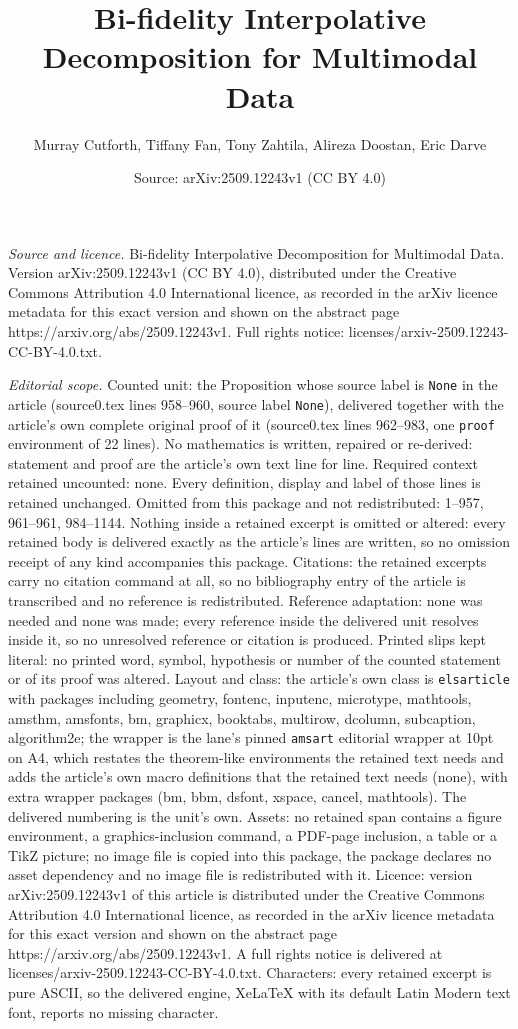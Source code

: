 \documentclass[10pt,a4paper]{amsart}
\title[Bi-fidelity Interpolative Decomposition for Multimodal Data]{Bi-fidelity Interpolative Decomposition for Multimodal Data}
\author{Murray Cutforth, Tiffany Fan, Tony Zahtila, Alireza Doostan, Eric Darve}
\date{Source: arXiv:2509.12243v1 (CC BY 4.0)}
\begin{document}
\maketitle

\noindent\emph{Source and licence.} Bi-fidelity Interpolative Decomposition for Multimodal Data. Version arXiv:2509.12243v1 (CC BY 4.0), distributed under the Creative Commons Attribution 4.0 International licence, as recorded in the arXiv licence metadata for this exact version and shown on the abstract page https://arxiv.org/abs/2509.12243v1. Full rights notice: licenses/arxiv-2509.12243-CC-BY-4.0.txt.\par\smallskip

\noindent\textit{Editorial scope.} Counted unit: the Proposition whose source label is \texttt{None} in the article (source0.tex lines 958--960, source label \texttt{None}), delivered together with the article's own complete original proof of it (source0.tex lines 962--983, one \texttt{proof} environment of 22 lines). No mathematics is written, repaired or re-derived: statement and proof are the article's own text line for line. Required context retained uncounted: none. Every definition, display and label of those lines is retained unchanged. Omitted from this package and not redistributed: 1--957, 961--961, 984--1144. Nothing inside a retained excerpt is omitted or altered: every retained body is delivered exactly as the article's lines are written, so no omission receipt of any kind accompanies this package. Citations: the retained excerpts carry no citation command at all, so no bibliography entry of the article is transcribed and no reference is redistributed. Reference adaptation: none was needed and none was made; every reference inside the delivered unit resolves inside it, so no unresolved reference or citation is produced. Printed slips kept literal: no printed word, symbol, hypothesis or number of the counted statement or of its proof was altered. Layout and class: the article's own class is \texttt{elsarticle} with packages including geometry, fontenc, inputenc, microtype, mathtools, amsthm, amsfonts, bm, graphicx, booktabs, multirow, dcolumn, subcaption, algorithm2e; the wrapper is the lane's pinned \texttt{amsart} editorial wrapper at 10pt on A4, which restates the theorem-like environments the retained text needs and adds the article's own macro definitions that the retained text needs (none), with extra wrapper packages (bm, bbm, dsfont, xspace, cancel, mathtools). The delivered numbering is the unit's own. Assets: no retained span contains a figure environment, a graphics-inclusion command, a PDF-page inclusion, a table or a TikZ picture; no image file is copied into this package, the package declares no asset dependency and no image file is redistributed with it. Licence: version arXiv:2509.12243v1 of this article is distributed under the Creative Commons Attribution 4.0 International licence, as recorded in the arXiv licence metadata for this exact version and shown on the abstract page https://arxiv.org/abs/2509.12243v1. A full rights notice is delivered at licenses/arxiv-2509.12243-CC-BY-4.0.txt. Characters: every retained excerpt is pure ASCII, so the delivered engine, XeLaTeX with its default Latin Modern text font, reports no missing character.
\end{document}
